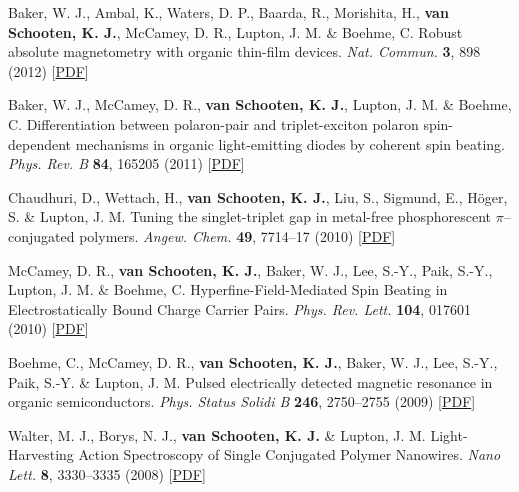 \documentclass[11pt,letterpaper]{article}
\begin{document}
\begin{bibenum}
		\item Baker, W. J., Ambal, K., Waters, D. P., Baarda, R., Morishita, H., \textbf{van Schooten, K. J.}, McCamey,
D. R., Lupton, J. M. \& Boehme, C. Robust absolute magnetometry with organic thin-film devices. \textit{Nat. Commun.} \textbf{3}, 898 (2012)  [\href{http://www.physics.utah.edu/~kippvs/papers/2012_NatComm.pdf}{PDF}]

		\item Baker, W. J., McCamey, D. R., \textbf{van Schooten, K. J.}, Lupton, J. M. \& Boehme, C. Differentiation between polaron-pair and triplet-exciton polaron spin-dependent mechanisms in organic light-emitting diodes by coherent spin beating. \textit{Phys. Rev. B} \textbf{84}, 165205 (2011)  [\href{http://www.physics.utah.edu/~kippvs/papers/2011_PRB.pdf}{PDF}]
		
		\item Chaudhuri, D., Wettach, H., \textbf{van Schooten, K. J.}, Liu, S., Sigmund, E., H\"{o}ger, S. \& Lupton, J. M. Tuning the singlet-triplet gap in metal-free phosphorescent $\pi$--conjugated polymers. \textit{Angew. Chem.} \textbf{49}, 7714--17 (2010)  [\href{http://www.physics.utah.edu/~kippvs/papers/2010_Angew.pdf}{PDF}]
		
		\item McCamey, D. R., \textbf{van Schooten, K. J.}, Baker, W. J., Lee, S.-Y., Paik, S.-Y., Lupton, J. M. \& Boehme, C. Hyperfine-Field-Mediated Spin Beating in Electrostatically Bound Charge Carrier Pairs. \textit{Phys. Rev. Lett.} \textbf{104}, 017601 (2010)  [\href{http://www.physics.utah.edu/~kippvs/papers/2010_PRL.pdf}{PDF}]
		
		\item Boehme, C., McCamey, D. R., \textbf{van Schooten, K. J.}, Baker, W. J., Lee, S.-Y., Paik, S.-Y. \& Lupton, J. M. Pulsed electrically detected magnetic resonance in organic semiconductors. \textit{Phys. Status Solidi B} \textbf{246}, 2750--2755 (2009)  [\href{http://www.physics.utah.edu/~kippvs/papers/2009_PSSb.pdf}{PDF}]
		
		\item Walter, M. J., Borys, N. J., \textbf{van Schooten, K. J.} \& Lupton, J. M. Light-Harvesting Action Spectroscopy of Single Conjugated Polymer Nanowires. \textit{Nano Lett.} \textbf{8}, 3330--3335 (2008)  [\href{http://www.physics.utah.edu/~kippvs/papers/2008_NanoLett.pdf}{PDF}]

\end{bibenum}
\vspace{\baselineskip} %
\end{document}
